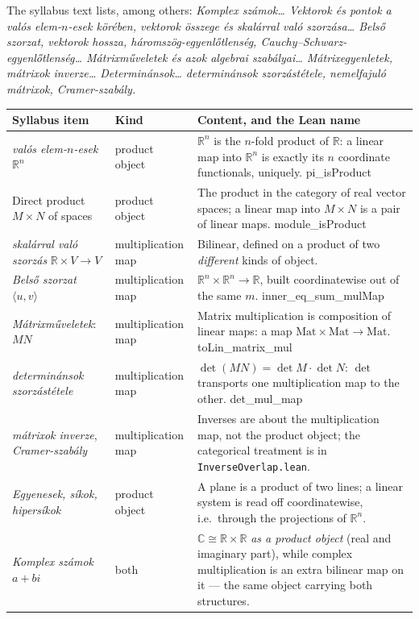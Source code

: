 \documentclass[11pt,a4paper]{article}
\theoremstyle{definition}
\newcommand{\lean}[1]{\textsf{\small #1}}
\newcommand{\Rn}{\mathbb{R}^n}
\begin{document}
The syllabus text lists, among others: \emph{Komplex számok\dots{} Vektorok és pontok a valós
elem-$n$-esek körében, vektorok összege és skalárral való szorzása\dots{} Belső szorzat,
vektorok hossza, háromszög-egyenlőtlenség, Cauchy--Schwarz-egyenlőtlenség\dots{}
Mátrixműveletek és azok algebrai szabályai\dots{} Mátrixegyenletek, mátrixok inverze\dots{}
Determinánsok\dots{} determinánsok szorzástétele, nemelfajuló mátrixok, Cramer-szabály.}

\begin{longtable}{@{}p{}p{}p{}@{}}
\toprule
\textbf{Syllabus item} & \textbf{Kind} & \textbf{Content, and the Lean name}\\
\midrule
\endhead
\emph{valós elem-$n$-esek} $\Rn$ &
product object &
$\Rn$ is the $n$-fold product of $\mathbb{R}$: a linear map into $\Rn$ is exactly its $n$
coordinate functionals, uniquely. \lean{pi\_isProduct}\\
Direct product $M\times N$ of spaces &
product object &
The product in the category of real vector spaces; a linear map into $M\times N$ is a pair
of linear maps. \lean{module\_isProduct}\\
\emph{skalárral való szorzás} $\mathbb{R}\times V\to V$ &
multiplication map &
Bilinear, defined on a product of two \emph{different} kinds of object.\\
\emph{Belső szorzat} $\langle u,v\rangle$ &
multiplication map &
$\Rn\times\Rn\to\mathbb{R}$, built coordinatewise out of the same $m$.
\lean{inner\_eq\_sum\_mulMap}\\
\emph{Mátrixműveletek}: $MN$ &
multiplication map &
Matrix multiplication is composition of linear maps: a map
$\mathrm{Mat}\times\mathrm{Mat}\to\mathrm{Mat}$. \lean{toLin\_matrix\_mul}\\
\emph{determinánsok szorzástétele} &
multiplication map &
$\det(MN)=\det M\cdot\det N$: $\det$ transports one multiplication map to the other.
\lean{det\_mul\_map}\\
\emph{mátrixok inverze}, \emph{Cramer-szabály} &
multiplication map &
Inverses are about the multiplication map, not the product object; the categorical
treatment is in \texttt{InverseOverlap.lean}.\\
\emph{Egyenesek, síkok, hipersíkok} &
product object &
A plane is a product of two lines; a linear system is read off coordinatewise, i.e.\ through
the projections of $\Rn$.\\
\emph{Komplex számok} $a+bi$ &
both &
$\mathbb{C}\cong\mathbb{R}\times\mathbb{R}$ \emph{as a product object} (real and imaginary
part), while complex multiplication is an extra bilinear map on it --- the same object
carrying both structures.\\
\bottomrule
\end{longtable}
\end{document}
